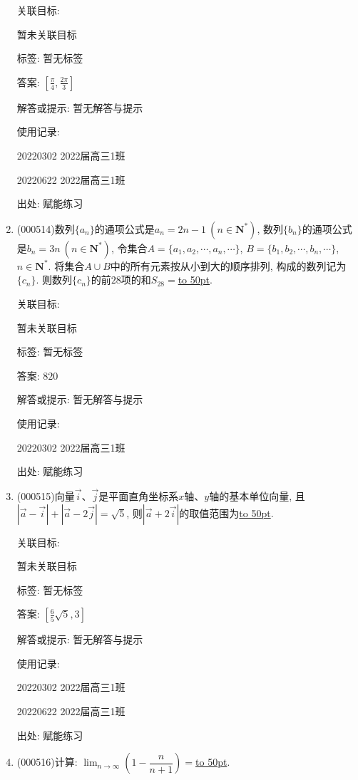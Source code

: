 \documentclass[10pt,a4paper]{article}
\newcommand{\blank}[1]{\underline{\hbox to #1pt{}}}
\begin{document}
\begin{enumerate}[1.]
关联目标:

暂未关联目标



标签: 暂无标签

答案: $[\frac{\pi }4, \frac{2\pi }3]$

解答或提示: 暂无解答与提示

使用记录:

20220302	2022届高三1班	

20220622	2022届高三1班  	


出处: 赋能练习
\item { (000514)}数列$\{a_n\}$的通项公式是$a_n=2n-1\ (n\in \mathbf{N}^*)$, 数列$\{b_n\}$的通项公式是$b_n=3n \ (n\in \mathbf{N}^*)$, 令集合$A=\{a_1,a_2,\cdots,a_n,\cdots\}$, $B=\{b_1,b_2,\cdots,b_n,\cdots\}$, $n\in \mathbf{N}^*$. 将集合$A\cup B$中的所有元素按从小到大的顺序排列, 构成的数列记为$\{c_n\}$. 则数列$\{c_n\}$的前$28$项的和$S_{28}=$\blank{50}.


关联目标:

暂未关联目标



标签: 暂无标签

答案: $820$

解答或提示: 暂无解答与提示

使用记录:

20220302	2022届高三1班	


出处: 赋能练习
\item { (000515)}向量$\overrightarrow{i}$、$\overrightarrow{j}$是平面直角坐标系$x$轴、$y$轴的基本单位向量, 且$|\overrightarrow a-\overrightarrow i|+|\overrightarrow a-2\overrightarrow j|=\sqrt5$, 则$|\overrightarrow a+2 \overrightarrow i|$的取值范围为\blank{50}.


关联目标:

暂未关联目标



标签: 暂无标签

答案: $[ \frac 65\sqrt 5,3]$

解答或提示: 暂无解答与提示

使用记录:

20220302	2022届高三1班	

20220622	2022届高三1班  	


出处: 赋能练习
\item { (000516)}计算: $\displaystyle\lim_{n\to\infty}(1-\dfrac n{n+1})=$\blank{50}.



\end{enumerate}
\end{document}
